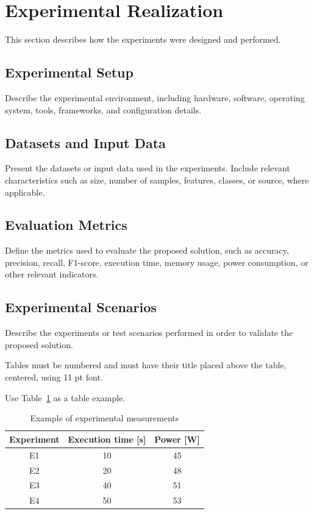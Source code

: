 \documentclass[12pt,a4paper]{article}
\begin{document}
\section{Experimental Realization}

This section describes how the experiments were designed and performed.

\subsection{Experimental Setup}

Describe the experimental environment, including hardware, software, operating system, tools, frameworks, and configuration details.

\subsection{Datasets and Input Data}

Present the datasets or input data used in the experiments. Include relevant characteristics such as size, number of samples, features, classes, or source, where applicable.

\subsection{Evaluation Metrics}

Define the metrics used to evaluate the proposed solution, such as accuracy, precision, recall, F1-score, execution time, memory usage, power consumption, or other relevant indicators.

\subsection{Experimental Scenarios}

Describe the experiments or test scenarios performed in order to validate the proposed solution.

Tables must be numbered and must have their title placed above the table, centered, using 11 pt font.

Use Table~\ref{tab:example} as a table example.

\begin{table}[htbp]
\centering
\caption{Example of experimental measurements \cite{b2}}
\label{tab:example}
\begin{tabular}{c c c}
 \hline
 \textbf{Experiment} & \textbf{Execution time [s]} & \textbf{Power [W]} \\
 \hline
 E1 & 10 & 45 \\
 E2 & 20 & 48 \\
 E3 & 40 & 51 \\
 E4 & 50 & 53 \\
 \hline
\end{tabular}
\end{table}
\end{document}
